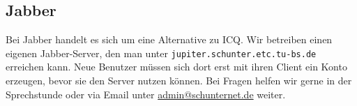 \subsection{Jabber}
Bei Jabber handelt es sich um eine Alternative zu ICQ. Wir betreiben
einen eigenen Jabber-Server, den man unter
\texttt{jupiter.schunter.etc.tu-bs.de} erreichen kann. Neue Benutzer
müssen sich dort erst mit ihren Client ein Konto erzeugen, bevor sie
den Server nutzen können. Bei Fragen helfen wir gerne in der \glossar
Sprechstunde oder via Email unter \url{admin@schunternet.de} weiter.

